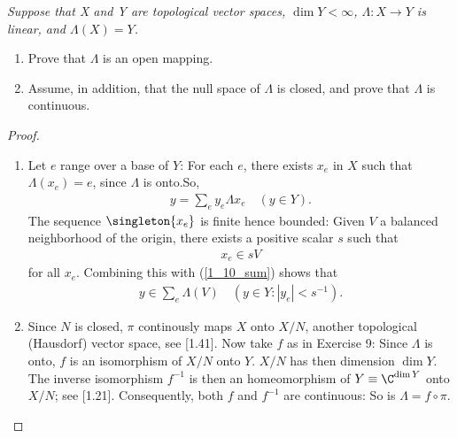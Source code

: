 \textit{Suppose that X and Y are topological vector spaces,
%
  $\dim Y < \infty$,
%
$\Lambda : X \to Y$ is linear, and $\Lambda(X) = Y$.}
%
  \begin{enumerate}
    \item{
      Prove that $\Lambda$ is an open mapping.}
    \item{
      Assume, in addition, that the null space of $\Lambda$ is closed, 
      and prove that $\Lambda$ is continuous.
    }
%
\end{enumerate}
\begin{proof}
  \begin{enumerate}
    \item{
      Let $e$ range over a base of $Y$: 
      For each $e$, there exists $x_e$ in $X$ such that 
        $\Lambda(x_e)=e$, 
      since $\Lambda$ is onto.So,
        \begin{align}\label{1_10_sum}
          y = \sum_{e} y_e \Lambda x_e \quad (y\in Y).
        \end{align}
      The sequence $\singleton{x_e}$ is finite hence bounded: 
        Given $V$ a balanced neighborhood of the origin, 
        there exists a positive scalar $s$ such that  
        \begin{align}
          x_e \in s V
        \end{align}
      for all $x_e$.
      Combining this with (\ref{1_10_sum}) shows that 
        \begin{align}
          y \in \sum_e \Lambda (V) \quad (y\in Y: |y_e| < s^{\minus 1}).
        \end{align}
  }
    \item{
      Since $N$ is closed, $\pi$ continously maps $X$ onto $X/N$, 
      another topological (Hausdorf) vector space, see [1.41]. 
      Now take $f$ as in Exercise 9: 
      Since $\Lambda$ is onto, $f$ is an isomorphism of $X/N$ onto $Y$. 
      $X/N$ has then dimension $\dim Y$. 
      The inverse isomorphism $f^{-1}$ is then an homeomorphism of 
        $Y\equiv \C^{\dim Y}$ 
      onto $X/N$; see [1.21].
      Consequently, both $f$ and $f^{-1}$ are continuous: So is $\Lambda = f\circ \pi$.
    }
  \end{enumerate}
\end{proof}